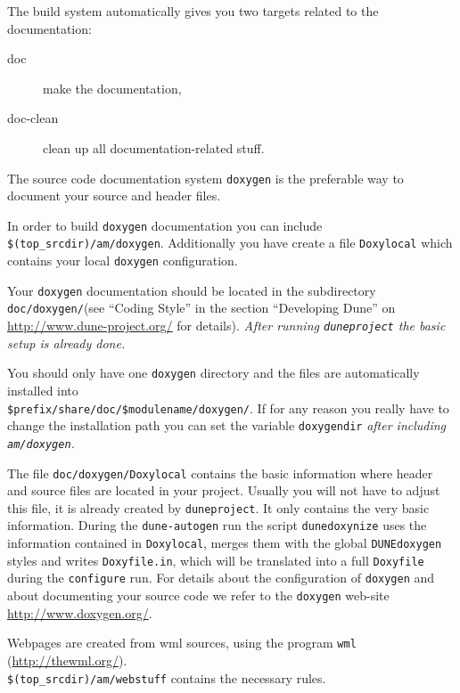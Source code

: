\documentclass[11pt,a4paper,headinclude,footinclude,DIV16,normalheadings]{scrartcl}
\newcommand{\dune}{\texttt{DUNE}\xspace}
\newcommand{\configure}{\texttt{configure}\xspace}
\newcommand{\duneproject}{\texttt{duneproject}\xspace}
\begin{document}
The build system automatically gives you two targets related to the documentation:
\begin{description}
 \item [doc] make the documentation,
 \item [doc-clean] clean up all documentation-related stuff.
\end{description}



The source code documentation system \texttt{doxygen}\xspace is the
preferable way to document your source and header files.

In order to build \texttt{doxygen} documentation you can include
\texttt{\$(top\_srcdir)/am/doxygen}. Additionally you have create a
file \texttt{Doxylocal} which contains your local \texttt{doxygen}
configuration.

Your \texttt{doxygen} documentation should be located in the
subdirectory \texttt{doc/doxygen/}\xspace (see ``Coding Style'' in the
section ``Developing Dune'' on
\url{http://www.dune-project.org/} for details). \em After
running \duneproject the basic setup is already done\em.

You should only have one \texttt{doxygen} directory and the files are
automatically installed into\\
\texttt{\$prefix/share/doc/\$modulename/doxygen/}. If for any reason
you really have to change the installation path you can set the
variable \texttt{doxygendir} \em after \em including \texttt{am/doxygen}.

The file \texttt{doc/doxygen/Doxylocal}\xspace contains the basic
information where header and source files are located in your
project. Usually you will not have to adjust this file, it is already
created by \duneproject. It only
contains the very basic information. During the \texttt{dune-autogen}\xspace
run the script \texttt{dunedoxynize}\xspace uses the information contained in
\texttt{Doxylocal}, merges them with the global \dune \texttt{doxygen}\xspace
styles and writes \texttt{Doxyfile.in}, which will be translated into a
full \texttt{Doxyfile}\xspace during the \configure run. For details about
the configuration of \texttt{doxygen}\xspace and about documenting your
source code we refer to the \texttt{doxygen}\xspace web-site
\url{http://www.doxygen.org/}.

Webpages are created from wml sources, using the program \texttt{wml}
(\url{http://thewml.org/}).\\
\texttt{\$(top\_srcdir)/am/webstuff} contains the necessary rules.
\end{document}
